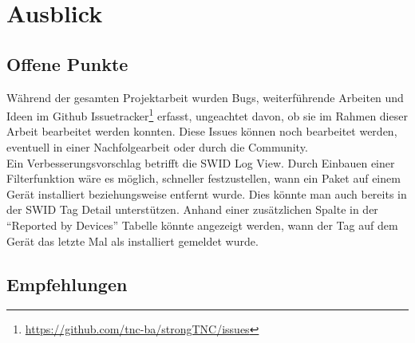 \chapter{Ausblick}

\section{Offene Punkte} 
Während der gesamten Projektarbeit wurden Bugs, weiterführende Arbeiten und
Ideen im Github
Issuetracker\footnote{\url{https://github.com/tnc-ba/strongTNC/issues}} erfasst,
ungeachtet davon, ob sie im Rahmen dieser Arbeit bearbeitet werden konnten.
Diese Issues können noch bearbeitet werden, eventuell in einer Nachfolgearbeit
oder durch die Community.\\
Ein Verbesserungsvorschlag betrifft die SWID Log View. Durch Einbauen
einer Filterfunktion wäre es möglich, schneller festzustellen, wann ein Paket auf
einem Gerät installiert beziehungsweise entfernt wurde. Dies könnte man auch
bereits in der SWID Tag Detail unterstützen. Anhand einer zusätzlichen Spalte in
der \enquote{Reported by Devices} Tabelle könnte angezeigt werden, wann der Tag
auf dem Gerät das letzte Mal als installiert gemeldet wurde.


\section{Empfehlungen} 

